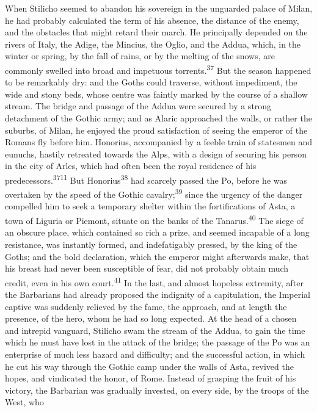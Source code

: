 When Stilicho seemed to abandon his sovereign in the unguarded
palace of Milan, he had probably calculated the term of his
absence, the distance of the enemy, and the obstacles that might
retard their march. He principally depended on the rivers of
Italy, the Adige, the Mincius, the Oglio, and the Addua, which,
in the winter or spring, by the fall of rains, or by the melting
of the snows, are commonly swelled into broad and impetuous
torrents.\textsuperscript{37} But the season happened to be remarkably dry: and
the Goths could traverse, without impediment, the wide and stony
beds, whose centre was faintly marked by the course of a shallow
stream. The bridge and passage of the Addua were secured by a
strong detachment of the Gothic army; and as Alaric approached
the walls, or rather the suburbs, of Milan, he enjoyed the proud
satisfaction of seeing the emperor of the Romans fly before him.
Honorius, accompanied by a feeble train of statesmen and eunuchs,
hastily retreated towards the Alps, with a design of securing his
person in the city of Arles, which had often been the royal
residence of his predecessors.\textsuperscript{3711} But Honorius\textsuperscript{38} had scarcely
passed the Po, before he was overtaken by the speed of the Gothic
cavalry;\textsuperscript{39} since the urgency of the danger compelled him to seek
a temporary shelter within the fortifications of Asta, a town of
Liguria or Piemont, situate on the banks of the Tanarus.\textsuperscript{40} The
siege of an obscure place, which contained so rich a prize, and
seemed incapable of a long resistance, was instantly formed, and
indefatigably pressed, by the king of the Goths; and the bold
declaration, which the emperor might afterwards make, that his
breast had never been susceptible of fear, did not probably
obtain much credit, even in his own court.\textsuperscript{41} In the last, and
almost hopeless extremity, after the Barbarians had already
proposed the indignity of a capitulation, the Imperial captive
was suddenly relieved by the fame, the approach, and at length
the presence, of the hero, whom he had so long expected. At the
head of a chosen and intrepid vanguard, Stilicho swam the stream
of the Addua, to gain the time which he must have lost in the
attack of the bridge; the passage of the Po was an enterprise of
much less hazard and difficulty; and the successful action, in
which he cut his way through the Gothic camp under the walls of
Asta, revived the hopes, and vindicated the honor, of Rome.
Instead of grasping the fruit of his victory, the Barbarian was
gradually invested, on every side, by the troops of the West, who
